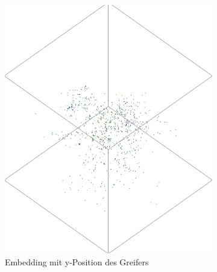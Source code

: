 	  \begin{figure}[h]
		\centering
		\begin{subfigure}[c]{0.49\textwidth}			
			\includegraphics[width=1\textwidth,center]{bilder/Hauptteil/Autoencoder_Grappel_Detection/y_embKopie.png}
			\caption{Embedding mit y-Position des Greifers}
			\label{img:Emb_y_AE}	
		\end{subfigure}
		\begin{subfigure}[c]{0.49\textwidth}			

\end{subfigure}
\end{figure}
